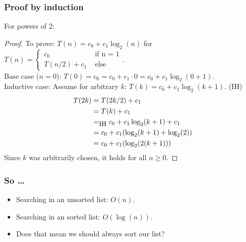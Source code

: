 \begin{frame}
	\frametitle{Proof by induction}

For powers of 2:

	\begin{proof}
		To prove: $T(n) = c_0 + c_1 \log_2(n)$ for $T(n)= \begin{cases}
			c_0 & \text{ if n = 1}\\
			T(n/2) + c_1 & \text{ else}
		\end{cases}$.	\\
		Base case ($n=0$): $T(0) = c_0 = c_0 + c_1 \cdot 0 = c_0 + c_1\log_2(0+1)$.\\
		Inductive case:
		Assume for arbitrary $k$: $T(k) = c_0 + c_1 \log_2(k+1)$. (IH)\\

		\begin{align*}
			T(2k) &= T(2k/2) + c_1\\
					 &= T(k) + c_1\\
					 &=_\text{\small IH} c_0 + c_1\log_2(k+1) + c_1\\
					 &= c_0 + c_1(\log_2(k+1) + \log_2(2))\\
					 &= c_0 + c_1(\log_2(2(k+1)))
		\end{align*}
		Since $k$ was arbitrarily chosen, it holds for all $n \geq 0$.
	\end{proof}
\end{frame}

\begin{frame}
	\frametitle{So \ldots}

				\begin{itemize}
					\item Searching in an unsorted list: $O(n)$.
					\item Searching in an sorted list: $O(\log(n))$.
					\item Does that mean we should always sort our list?
		\end{itemize}	
\end{frame}